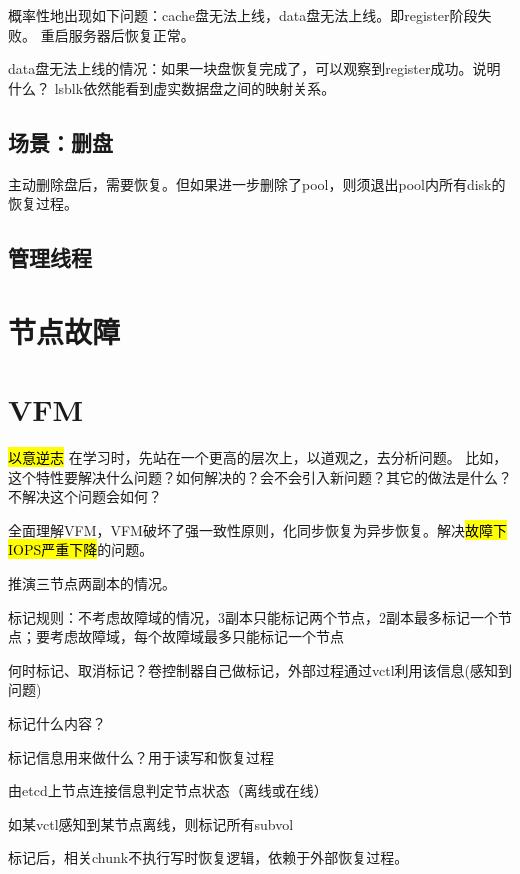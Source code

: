 概率性地出现如下问题：cache盘无法上线，data盘无法上线。即register阶段失败。
重启服务器后恢复正常。

data盘无法上线的情况：如果一块盘恢复完成了，可以观察到register成功。说明什么？
lsblk依然能看到虚实数据盘之间的映射关系。

\subsection{场景：删盘}

主动删除盘后，需要恢复。但如果进一步删除了pool，则须退出pool内所有disk的恢复过程。

\subsection{管理线程}

\section{节点故障}

\section{VFM}

\hl{以意逆志} 在学习时，先站在一个更高的层次上，以道观之，去分析问题。
比如，这个特性要解决什么问题？如何解决的？会不会引入新问题？其它的做法是什么？
不解决这个问题会如何？

全面理解VFM，VFM破坏了强一致性原则，化同步恢复为异步恢复。解决\hl{故障下IOPS严重下降}的问题。

推演三节点两副本的情况。

\begin{enumbox}
\item 标记规则：不考虑故障域的情况，3副本只能标记两个节点，2副本最多标记一个节点；要考虑故障域，每个故障域最多只能标记一个节点
\item 何时标记、取消标记？卷控制器自己做标记，外部过程通过vctl利用该信息(感知到问题)
\item 标记什么内容？ 
\item 标记信息用来做什么？用于读写和恢复过程
\item *
\item 由etcd上节点连接信息判定节点状态（离线或在线）
\item 如某vctl感知到某节点离线，则标记所有subvol
\end{enumbox}

标记后，相关chunk不执行写时恢复逻辑，依赖于外部恢复过程。

